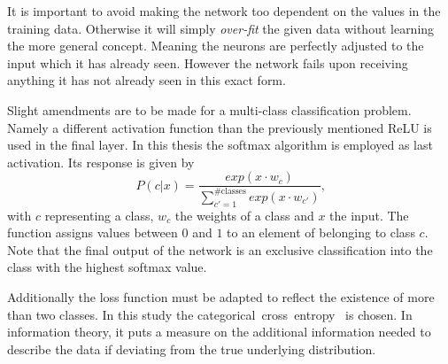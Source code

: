 It is important to avoid making the network too dependent on the values in the training data. Otherwise it will simply \textit{over-fit} the given data without learning the more general concept. Meaning the neurons are perfectly adjusted to the input which it has already seen. However the network fails upon receiving anything it has not already seen in this exact form.

Slight amendments are to be made for a multi-class classification problem. Namely a different activation function than the previously mentioned ReLU is used in the final layer. In this thesis the softmax algorithm is employed as last activation. Its response is given by
\begin{equation}
	P(c | x) = \frac{exp(x \cdot w_c)}{\sum \limits_{c' = 1}^{\#\text{classes}} exp(x \cdot w_{c'})}
	\text{,}
\end{equation}
with $c$ representing a class, $w_c$ the weights of a class and $x$ the input. The function assigns values between $0$ and $1$ to an element of belonging to class $c$. Note that the final output of the network is an exclusive classification into the class with the highest softmax value.

Additionally the loss function must be adapted to reflect the existence of more than two classes. In this study the categorical~cross~entropy~\cite{MachineLearning:LinearClassification} is chosen. In information theory, it puts a measure on the additional information needed to describe the data if deviating from the true underlying distribution.
